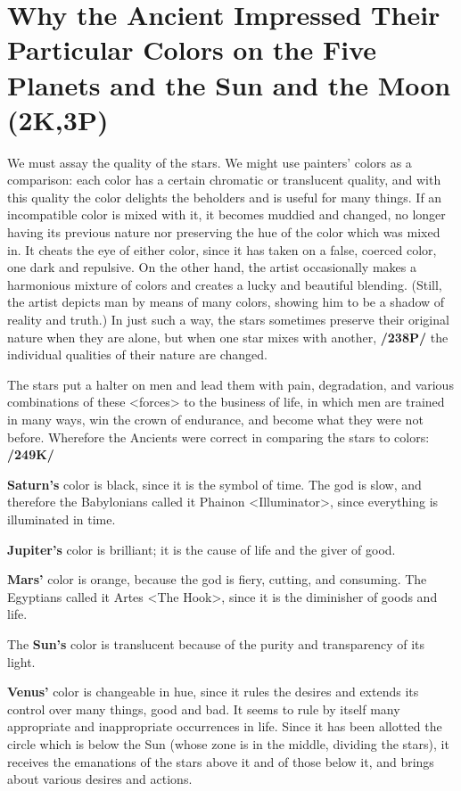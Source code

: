 \section{Why the Ancient Impressed Their Particular Colors on the Five Planets and the Sun and the Moon (2K,3P)}

We must assay the quality of the stars. We might use painters’ colors as a comparison: each color has a certain chromatic or translucent quality, and with this quality the color delights the beholders and is
useful for many things. If an incompatible color is mixed with it, it becomes muddied and changed, no longer having its previous nature nor preserving the hue of the color which was mixed in. It cheats the eye of either color, since it has taken on a false, coerced color, one dark and repulsive. On the other hand, the artist occasionally makes a harmonious mixture of colors and creates a lucky and beautiful blending. (Still, the artist depicts man by means of many colors, showing him to be a shadow of reality and truth.) In just such a way, the stars sometimes preserve their original nature when they are alone, but when one star mixes with another, \textbf{/238P/} the individual qualities of their nature are changed. 

The stars put a halter on men and lead them with pain, degradation, and various combinations of these <forces> to the business of life, in which men are trained in many ways, win the crown of endurance, and become what they were not before. Wherefore the Ancients were correct in comparing the stars to colors: \textbf{/249K/}

\textbf{Saturn’s} color is black, since it is the symbol of time. The god is slow, and therefore the Babylonians called it Phainon <Illuminator>, since everything is illuminated in time.

\textbf{Jupiter’s} color is brilliant; it is the cause of life and the giver of good.

\textbf{Mars’} color is orange, because the god is fiery, cutting, and consuming. The Egyptians called it Artes <The Hook>, since it is the diminisher of goods and life.

The \textbf{Sun’s} color is translucent because of the purity and transparency of its light.

\textbf{Venus’} color is changeable in hue, since it rules the desires and extends its control over many things, good and bad. It seems to rule by itself many appropriate and inappropriate occurrences in life. Since it has been allotted the circle which is below the Sun (whose zone is in the middle, dividing the stars), it receives the emanations of the stars above it and of those below it, and brings about various desires and actions.


